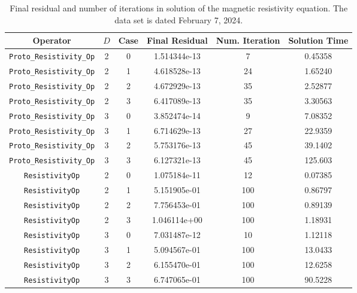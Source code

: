 \documentclass{article}
\begin{document}
\begin{small}
\begin{table}
\begin{center}
\begin{tabular}{|c|c|c|c|c||c|} \hline
 Operator                   & $D$ & Case & Final Residual &
 Num. Iteration & Solution Time\\
\hline
 \hline
 {\tt Proto\_Resistivity\_Op}     & 2   & 0    & 1.514344e-13   & 7  & 0.45358  \\
 {\tt Proto\_Resistivity\_Op}     & 2   & 1    & 4.618528e-13   & 24 & 1.65240  \\
 {\tt Proto\_Resistivity\_Op}     & 2   & 2    & 4.672929e-13   & 35 & 2.52877  \\
 {\tt Proto\_Resistivity\_Op}     & 2   & 3    & 6.417089e-13   & 35 & 3.30563  \\
 {\tt Proto\_Resistivity\_Op}     & 3   & 0    & 3.852474e-14   & 9  & 7.08352  \\
 {\tt Proto\_Resistivity\_Op}     & 3   & 1    & 6.714629e-13   & 27 & 22.9359  \\
 {\tt Proto\_Resistivity\_Op}     & 3   & 2    & 5.753176e-13   & 45 & 39.1402  \\
 {\tt Proto\_Resistivity\_Op}     & 3   & 3    & 6.127321e-13   & 45 & 125.603  \\
 \hline                                                    
 {\tt ResistivityOp}              & 2   & 0    & 1.075184e-11   & 12 & 0.07385  \\
 {\tt ResistivityOp}              & 2   & 1    & 5.151905e-01   & 100& 0.86797  \\
 {\tt ResistivityOp}              & 2   & 2    & 7.756453e-01   & 100& 0.89139  \\
 {\tt ResistivityOp}              & 2   & 3    & 1.046114e+00   & 100& 1.18931  \\
 {\tt ResistivityOp}              & 3   & 0    & 7.031487e-12   & 10 & 1.12118  \\
 {\tt ResistivityOp}              & 3   & 1    & 5.094567e-01   & 100& 13.0433  \\
 {\tt ResistivityOp}              & 3   & 2    & 6.155470e-01   & 100& 12.6258  \\
 {\tt ResistivityOp}              & 3   & 3    & 6.747065e-01   & 100& 90.5228  \\
\hline
\end{tabular}
\end{center}
\label{tab::resist}
\caption
    {
      Final residual and number of iterations in solution of the
      magnetic resistivity equation.
      The data set is dated February 7, 2024.
    }
\end{table}
\end{small}
\end{document}
